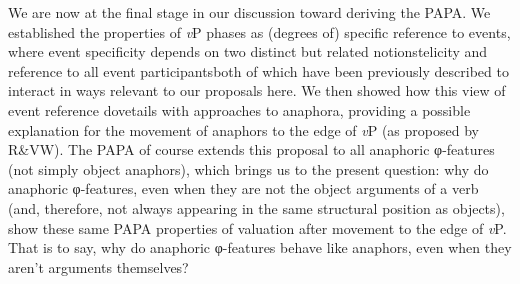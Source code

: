 \documentclass[output=paper
,modfonts
,nonflat
]{langsci/langscibook}
\begin{document}
We are now at the final stage in our discussion toward deriving the PAPA. We established the properties of \textit{v}P phases as (degrees of) specific reference to events, where event specificity depends on two distinct but related notions\textemdash telicity and reference to all event participants\textemdash both of which have been previously described to interact in ways relevant to our proposals here. We then showed how this view of event reference dovetails with approaches to anaphora, providing a possible explanation for the movement of anaphors to the edge of \textit{v}P (as proposed by R\&VW). The PAPA of course extends this proposal to all anaphoric φ-features (not simply object anaphors), which brings us to the present question: why do anaphoric φ-features, even when they are not the object arguments of a verb (and, therefore, not always appearing in the same structural position as objects), show these same PAPA properties of valuation after movement to the edge of \textit{v}P.  That is to say, why do anaphoric φ-features behave like anaphors, even when they aren’t arguments themselves?
\end{document}
